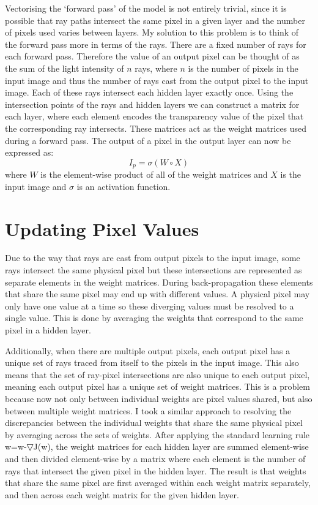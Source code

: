\documentclass[]{article}
\begin{document}
Vectorising the ‘forward pass’ of the model is not entirely trivial, since it is possible that ray paths intersect the same pixel in a given layer and the number of pixels used varies between layers. 
My solution to this problem is to think of the forward pass more in terms of the rays. There are a fixed number of rays for each forward pass. Therefore the value of an output pixel can be thought of as the sum of the light intensity of $n$ rays, where $n$ is the number of pixels in the input image and thus the number of rays cast from the output pixel to the input image. Each of these rays intersect each hidden layer exactly once. Using the intersection points of the rays and hidden layers we can construct a matrix for each layer, where each element encodes the transparency value of the pixel that the corresponding ray intersects. These matrices act as the weight matrices used during a forward pass. The output of a pixel in the output layer can now be expressed as: 
$$I_p=\sigma(W\circ X)$$
where $W$ is the element-wise product of all of the weight matrices and $X$ is the input image and $\sigma$ is an activation function.

\section{Updating Pixel Values}
Due to the way that rays are cast from output pixels to the input image, some rays intersect the same physical pixel but these intersections are represented as separate elements in the weight matrices. During back-propagation these elements that share the same pixel may end up with different values. A physical pixel may only have one value at a time so these diverging values must be resolved to a single value. This is done by averaging the weights that correspond to the same pixel in a hidden layer.

Additionally, when there are multiple output pixels, each output pixel has a unique set of rays traced from itself to the pixels in the input image. This also means that the set of ray-pixel intersections are also unique to each output pixel, meaning each output pixel has a unique set of weight matrices. This is a problem because now not only between individual weights are pixel values shared, but also between multiple weight matrices. I took a similar approach to resolving the discrepancies between the individual weights that share the same physical pixel by averaging across the sets of weights. After applying the standard learning rule w=w-▽J(w), the weight matrices for each hidden layer are summed element-wise and then divided element-wise by a matrix where each element is the number of rays that intersect the given pixel in the hidden layer. The result is that weights that share the same pixel are first averaged within each weight matrix separately, and then across each weight matrix for the given hidden layer.
\end{document}
